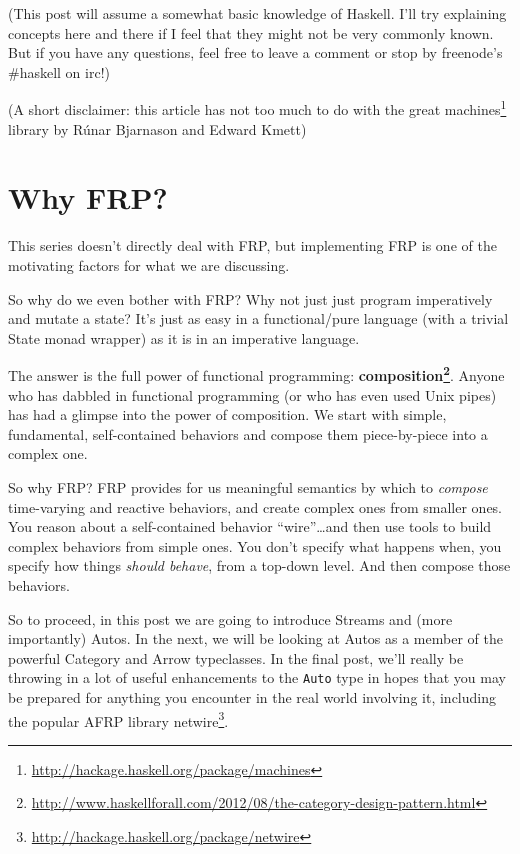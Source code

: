 \documentclass[]{article}
\renewcommand{\href}[2]{#2\footnote{\url{#1}}}
\begin{document}
(This post will assume a somewhat basic knowledge of Haskell. I'll try
explaining concepts here and there if I feel that they might not be very
commonly known. But if you have any questions, feel free to leave a comment or
stop by freenode's \#haskell on irc!)

(A short disclaimer: this article has not too much to do with the great
\href{http://hackage.haskell.org/package/machines}{machines} library by Rúnar
Bjarnason and Edward Kmett)

\section{Why FRP?}\label{why-frp}

This series doesn't directly deal with FRP, but implementing FRP is one of the
motivating factors for what we are discussing.

So why do we even bother with FRP? Why not just just program imperatively and
mutate a state? It's just as easy in a functional/pure language (with a trivial
State monad wrapper) as it is in an imperative language.

The answer is the full power of functional programming:
\textbf{\href{http://www.haskellforall.com/2012/08/the-category-design-pattern.html}{composition}}.
Anyone who has dabbled in functional programming (or who has even used Unix
pipes) has had a glimpse into the power of composition. We start with simple,
fundamental, self-contained behaviors and compose them piece-by-piece into a
complex one.

So why FRP? FRP provides for us meaningful semantics by which to \emph{compose}
time-varying and reactive behaviors, and create complex ones from smaller ones.
You reason about a self-contained behavior ``wire''\ldots and then use tools to
build complex behaviors from simple ones. You don't specify what happens when,
you specify how things \emph{should behave}, from a top-down level. And then
compose those behaviors.

So to proceed, in this post we are going to introduce Streams and (more
importantly) Autos. In the next, we will be looking at Autos as a member of the
powerful Category and Arrow typeclasses. In the final post, we'll really be
throwing in a lot of useful enhancements to the \texttt{Auto} type in hopes that
you may be prepared for anything you encounter in the real world involving it,
including the popular AFRP library
\href{http://hackage.haskell.org/package/netwire}{netwire}.
\end{document}
